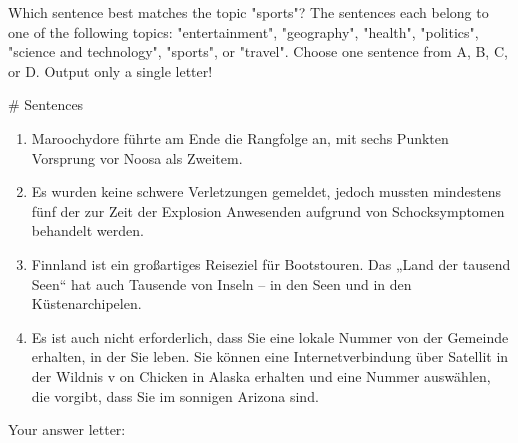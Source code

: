 \clearpage
\begin{figure*}[ht]
\begin{tcolorbox}[
    colback=white!95!black,    %
    colframe=black,            %
    title=Topic-To-Sentence (\tts), %
    fonttitle=\bfseries,       %
    boxrule=0.5pt,             %
    arc=4pt,                   %
    outer arc=4pt,
    width=\textwidth,          %
    before skip=1em,           %
    after skip=1em,            %
]

Which sentence best matches the topic "sports"? The sentences each belong to one of the following topics: "entertainment", "geography", "health", "politics", "science and technology", "sports", or "travel". Choose one sentence from A, B, C, or D. Output only
 a single letter!

\medskip

\# Sentences

\begin{enumerate}[label=\Alph*., itemsep=0pt, topsep=0pt]
    \item \textasciigrave\textasciigrave\textasciigrave Maroochydore führte am Ende die Rangfolge an, mit sechs Punkten Vorsprung vor Noosa als Zweitem.\textasciigrave\textasciigrave\textasciigrave
    \item \textasciigrave\textasciigrave\textasciigrave 
    Es wurden keine schwere Verletzungen gemeldet, jedoch mussten mindestens fünf der zur Zeit der Explosion Anwesenden aufgrund von Schocksymptomen behandelt werden.\textasciigrave\textasciigrave\textasciigrave
    \item \textasciigrave\textasciigrave\textasciigrave 
    Finnland ist ein großartiges Reiseziel für Bootstouren. Das „Land der tausend Seen“ hat auch Tausende von Inseln – in den Seen und in den Küstenarchipelen.\textasciigrave\textasciigrave\textasciigrave
    \item \textasciigrave\textasciigrave\textasciigrave 
    Es ist auch nicht erforderlich, dass Sie eine lokale Nummer von der Gemeinde erhalten, in der Sie leben. Sie können eine Internetverbindung über Satellit in der Wildnis v on Chicken in Alaska erhalten und eine Nummer auswählen, die vorgibt, dass Sie im sonnigen Arizona sind.\textasciigrave\textasciigrave\textasciigrave
\end{enumerate}

\medskip

Your answer letter: 

\end{tcolorbox}
\end{figure*}

